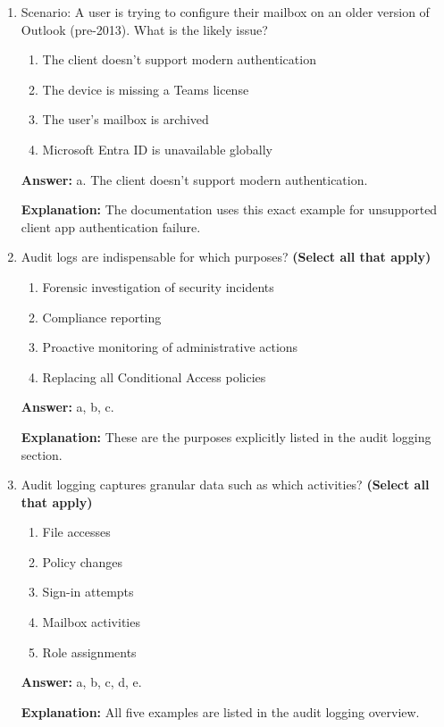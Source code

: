 \documentclass[10pt]{article}
\begin{document}
\begin{enumerate}[leftmargin=*]
\textbf{Explanation:} These are the exact investigative steps listed in the documentation.

\item Scenario: A user is trying to configure their mailbox on an older version of Outlook (pre-2013). What is the likely issue?
\begin{enumerate}[label=\alph*., leftmargin=1.5em]
\item The client doesn’t support modern authentication
\item The device is missing a Teams license
\item The user’s mailbox is archived
\item Microsoft Entra ID is unavailable globally
\end{enumerate}
\textbf{Answer:} a. The client doesn’t support modern authentication.

\textbf{Explanation:} The documentation uses this exact example for unsupported client app authentication failure.

\item Audit logs are indispensable for which purposes? \textbf{(Select all that apply)}
\begin{enumerate}[label=\alph*., leftmargin=1.5em]
\item Forensic investigation of security incidents
\item Compliance reporting
\item Proactive monitoring of administrative actions
\item Replacing all Conditional Access policies
\end{enumerate}
\textbf{Answer:} a, b, c.

\textbf{Explanation:} These are the purposes explicitly listed in the audit logging section.

\item Audit logging captures granular data such as which activities? \textbf{(Select all that apply)}
\begin{enumerate}[label=\alph*., leftmargin=1.5em]
\item File accesses
\item Policy changes
\item Sign-in attempts
\item Mailbox activities
\item Role assignments
\end{enumerate}
\textbf{Answer:} a, b, c, d, e.

\textbf{Explanation:} All five examples are listed in the audit logging overview.


\end{enumerate}
\end{document}
